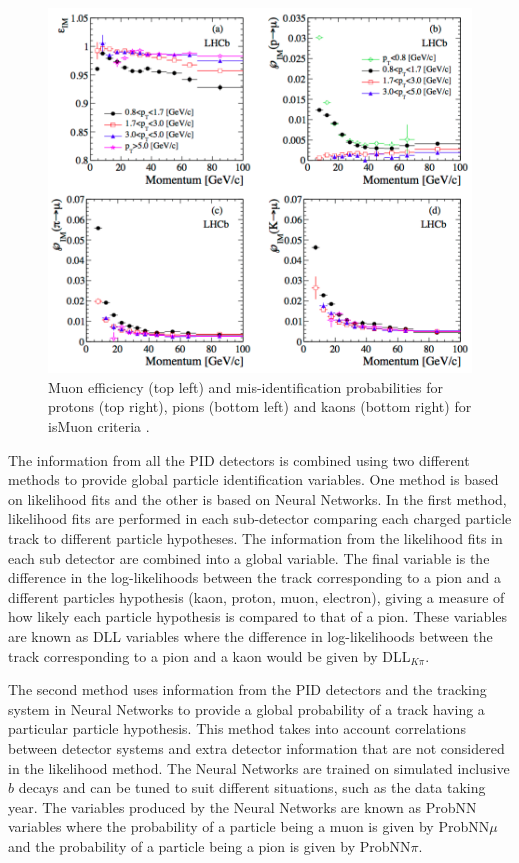 \begin{figure}[htb] 
  \centering    
  \includegraphics[width=1.0\textwidth]{./Figs/LHC_LHCb/isMuon_eff.png}
  \caption{Muon efficiency (top left) and mis-identification probabilities for protons (top right), pions (bottom left) and kaons (bottom right) for isMuon criteria \cite{Archilli:2013npa}. }
  \label{fig:isMuon_efficiency}
\end{figure}




The information from all the PID detectors is combined using two different methods to provide global particle identification variables. One method is based on likelihood fits and the other is based on Neural Networks. In the first method, likelihood fits are performed in each sub-detector comparing each charged particle track to different particle hypotheses. The information from the likelihood fits in each sub detector are combined into a global variable. The final variable is the difference in the log-likelihoods between the track corresponding to a pion and a different particles hypothesis (kaon, proton, muon, electron), giving a measure of how likely each particle hypothesis is compared to that of a pion. These variables are known as DLL variables where the difference in log-likelihoods between the track corresponding to a pion and a kaon would be given by DLL$_{K\pi}$.




The second method uses information from the PID detectors and the tracking system in Neural Networks to provide a global probability of a track having a particular particle hypothesis. This method takes into account correlations between detector systems and extra detector information that are not considered in the likelihood method. The Neural Networks are trained on simulated inclusive $b$ decays and can be tuned to suit different situations, such as the data taking year. The variables produced by the Neural Networks are known as ProbNN variables where the probability of a particle being a muon is given by ProbNN$\mu$ and the probability of a particle being a pion is given by ProbNN$\pi$.


